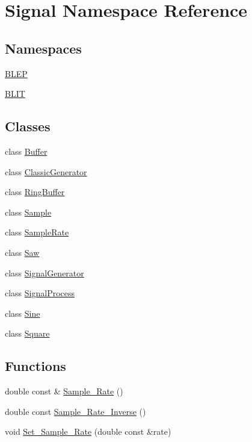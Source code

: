 \hypertarget{namespace_signal}{\section{Signal Namespace Reference}
\label{namespace_signal}
}
\subsection*{Namespaces}
\begin{DoxyCompactItemize}
\item 
 \hyperlink{namespace_signal_1_1_b_l_e_p}{B\+L\+E\+P}
\item 
 \hyperlink{namespace_signal_1_1_b_l_i_t}{B\+L\+I\+T}
\end{DoxyCompactItemize}
\subsection*{Classes}
\begin{DoxyCompactItemize}
\item 
class \hyperlink{class_signal_1_1_buffer}{Buffer}
\item 
class \hyperlink{class_signal_1_1_classic_generator}{Classic\+Generator}
\item 
class \hyperlink{class_signal_1_1_ring_buffer}{Ring\+Buffer}
\item 
class \hyperlink{class_signal_1_1_sample}{Sample}
\item 
class \hyperlink{class_signal_1_1_sample_rate}{Sample\+Rate}
\item 
class \hyperlink{class_signal_1_1_saw}{Saw}
\item 
class \hyperlink{class_signal_1_1_signal_generator}{Signal\+Generator}
\item 
class \hyperlink{class_signal_1_1_signal_process}{Signal\+Process}
\item 
class \hyperlink{class_signal_1_1_sine}{Sine}
\item 
class \hyperlink{class_signal_1_1_square}{Square}
\end{DoxyCompactItemize}
\subsection*{Functions}
\begin{DoxyCompactItemize}
\item 
double const \& \hyperlink{namespace_signal_ae7b1f222afc010e0f33f306f978fcde9}{Sample\+\_\+\+Rate} ()
\item 
double const \hyperlink{namespace_signal_ae7e8bbfcac6571aaaf18d7f96f3fefc3}{Sample\+\_\+\+Rate\+\_\+\+Inverse} ()
\item 
void \hyperlink{namespace_signal_a2f163a7bbf1b0fc76ceba8b0916a7890}{Set\+\_\+\+Sample\+\_\+\+Rate} (double const \&rate)
\end{DoxyCompactItemize}


